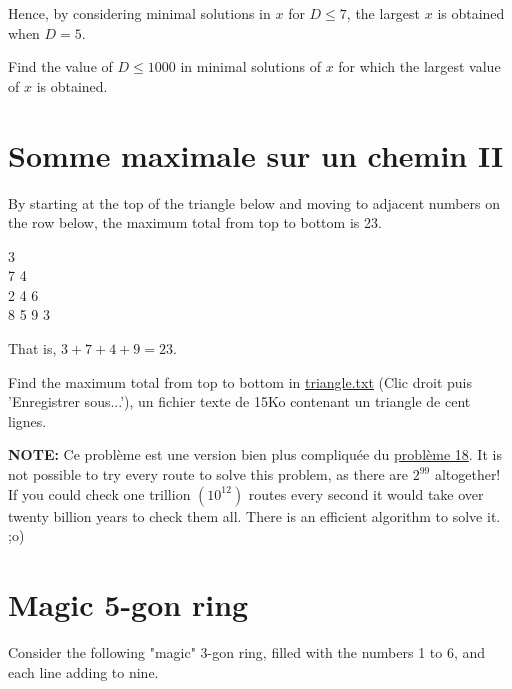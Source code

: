 Hence, by considering minimal solutions in $x$ for $D  \leqslant  7$, the largest $x$ is obtained when $D=5$.

Find the value of $D  \leqslant  1000$ in minimal solutions of $x$ for which the largest value of $x$ is obtained.

\section{Somme maximale sur un chemin II} \label{pb.067}


By starting at the top of the triangle below and moving to adjacent numbers on the row below, the maximum total from top to bottom is 23.

\begin{center}
    \textcolor[rgb]{1,0,0}{3}\\\textcolor[rgb]{1,0,0}{7} 4\\2 \textcolor[rgb]{1,0,0}{4} 6\\8 5 \textcolor[rgb]{1,0,0}{9} 3\\
\end{center}

That is, $3 + 7 + 4 + 9 = 23$.

Find the maximum total from top to bottom in \href{https://projecteuler.net/project/resources/p067_triangle.txt}{triangle.txt} (Clic droit puis 'Enregistrer sous...'), un fichier texte de 15Ko contenant un triangle de cent lignes.

\textbf{NOTE:} Ce problème est une version bien plus compliquée du \hyperref[pb.018]{problème 18}. It is not possible to try every route to solve this problem, as there are $2^{99}$ altogether! If you could check one trillion $(10^{12})$ routes every second it would take over twenty billion years to check them all. There is an efficient algorithm to solve it. ;o)

\section{Magic 5-gon ring} \label{pb.068}
Consider the following "magic" 3-gon ring, filled with the numbers 1 to 6, and each line adding to nine.

\begin{center}
\end{center}

